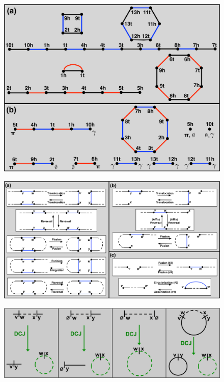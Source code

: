 \begin{figure}
\centering
\includegraphics[width=\textwidth]{images/BMC2012/genomes_breakpoint_graph}
\end{figure}

\begin{figure}
\centering
\includegraphics[width=\textwidth]{images/BMC2012/DCJ}
\end{figure}

\begin{figure}
\centering
\includegraphics[width=\textwidth]{images/BMC2012/indel_as_DCJ}
\end{figure}


